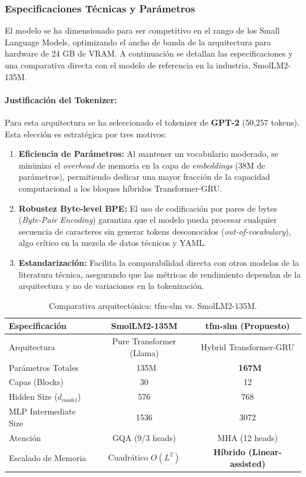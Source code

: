 \subsubsection{Especificaciones Técnicas y Parámetros}
El modelo se ha dimensionado para ser competitivo en el rango de los Small Language Models, optimizando el ancho de banda de la arquitectura para hardware de 24 GB de VRAM. A continuación se detallan las especificaciones y una comparativa directa con el modelo de referencia en la industria, SmolLM2-135M.

\paragraph{Justificación del Tokenizer:} Para esta arquitectura se ha seleccionado el tokenizer de \textbf{GPT-2} (50,257 tokens). Esta elección es estratégica por tres motivos:
\begin{enumerate}
    \item \textbf{Eficiencia de Parámetros:} Al mantener un vocabulario moderado, se minimiza el \textit{overhead} de memoria en la capa de \textit{embeddings} (38M de parámetros), permitiendo dedicar una mayor fracción de la capacidad computacional a los bloques híbridos Transformer-GRU.
    \item \textbf{Robustez Byte-level BPE:} El uso de codificación por pares de bytes (\textit{Byte-Pair Encoding}) garantiza que el modelo pueda procesar cualquier secuencia de caracteres sin generar tokens desconocidos (\textit{out-of-vocabulary}), algo crítico en la mezcla de datos técnicos y YAML.
    \item \textbf{Estandarización:} Facilita la comparabilidad directa con otros modelos de la literatura técnica, asegurando que las métricas de rendimiento dependan de la arquitectura y no de variaciones en la tokenización.
\end{enumerate}

\begin{table}[H]
\centering
\begin{tabularx}{\textwidth}{|X|c|c|}
\hline
\textbf{Especificación} & \textbf{SmolLM2-135M} & \textbf{tfm-slm (Propuesto)} \\ \hline
Arquitectura & Pure Transformer (Llama) & Hybrid Transformer-GRU \\ \hline
Parámetros Totales & ~135M & \textbf{~167M} \\ \hline
Capas (Blocks) & 30 & 12 \\ \hline
Hidden Size ($d_{model}$) & 576 & 768 \\ \hline
MLP Intermediate Size & 1536 & 3072 \\ \hline
Atención & GQA (9/3 heads) & MHA (12 heads) \\ \hline
Escalado de Memoria & Cuadrático $O(L^2)$ & \textbf{Híbrido (Linear-assisted)} \\ \hline
\end{tabularx}
\caption{Comparativa arquitectónica: tfm-slm vs. SmolLM2-135M.}
\label{tab:comparativa_smollm}
\end{table}

